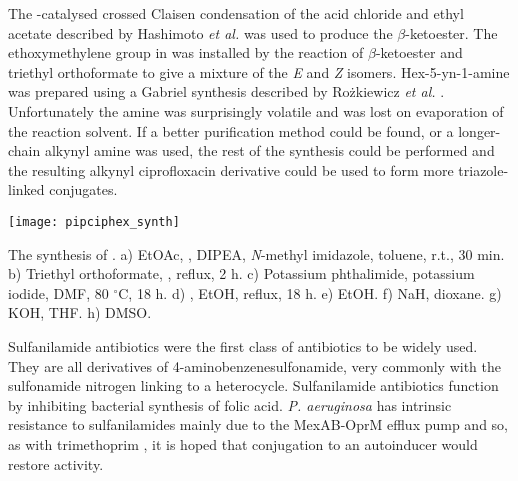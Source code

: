 The -catalysed crossed Claisen condensation of the acid chloride  and ethyl acetate described by Hashimoto \textit{et al.} \cite{Hashimoto2006} was used to produce the $\beta$-ketoester.
The ethoxymethylene group in  was installed by the reaction of $\beta$-ketoester  and triethyl orthoformate to give a mixture of the \textit{E} and \textit{Z} isomers\cite{Senthilkumar2009,Mitscher1986}.
Hex-5-yn-1-amine  was prepared using a Gabriel synthesis \cite{Gabriel1887} described by Rożkiewicz \textit{et al.} \cite{Rozkiewicz2006}. Unfortunately the amine was surprisingly volatile and was lost on evaporation of the reaction solvent. If a better purification method could be found, or a longer-chain alkynyl amine was used, the rest of the synthesis could be performed and the resulting alkynyl ciprofloxacin derivative  could be used to form more triazole-linked conjugates.

\begin{scheme}[H]
	\begin{center}
		\texttt{[image: pipciphex\_synth]}
		\caption{The synthesis of .
		a) EtOAc, , DIPEA, \textit{N}-methyl imidazole, toluene, r.t., 30 min.
		b) Triethyl orthoformate, , reflux, 2 h.
		c) Potassium phthalimide, potassium iodide, DMF, 80 $^{\circ}$C, 18 h.
		d) , EtOH, reflux, 18 h.
		e) EtOH.
		f) NaH, dioxane.
		g) KOH, THF.
		h) DMSO.
		\label{sch:pipciphex_synth}}
	\end{center}
\end{scheme}


Sulfanilamide antibiotics were the first class of antibiotics to be widely used\cite{Otten1986,Wainwright2011}. They are all derivatives of 4-aminobenzenesulfonamide, very commonly with the sulfonamide nitrogen linking to a heterocycle. Sulfanilamide antibiotics function by inhibiting bacterial synthesis of folic acid. \textit{P. aeruginosa} has intrinsic resistance to sulfanilamides mainly due to the MexAB-OprM efflux pump\cite{Kohler1996} and so, as with trimethoprim , it is hoped that conjugation to an autoinducer would restore activity.

